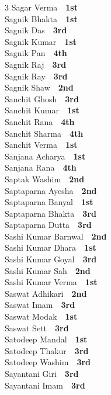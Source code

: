 \documentclass[11pt,a4paper]{article}
\begin{document}
\begin{multicols}{3}
Sagar Verma~\dotfill~\textbf{1st}\\
Sagnik Bhakta~\dotfill~\textbf{1st}\\
Sagnik Das~\dotfill~\textbf{3rd}\\
Sagnik Kumar~\dotfill~\textbf{1st}\\
Sagnik Pan~\dotfill~\textbf{4th}\\
Sagnik Raj~\dotfill~\textbf{3rd}\\
Sagnik Ray~\dotfill~\textbf{3rd}\\
Sagnik Shaw~\dotfill~\textbf{2nd}\\
Sanchit Ghosh~\dotfill~\textbf{3rd}\\
Sanchit Kumar~\dotfill~\textbf{1st}\\
Sanchit Rana~\dotfill~\textbf{4th}\\
Sanchit Sharma~\dotfill~\textbf{4th}\\
Sanchit Verma~\dotfill~\textbf{1st}\\
Sanjana Acharya~\dotfill~\textbf{1st}\\
Sanjana Rana~\dotfill~\textbf{4th}\\
Saptak Washim~\dotfill~\textbf{2nd}\\
Saptaparna Ayesha~\dotfill~\textbf{2nd}\\
Saptaparna Banyal~\dotfill~\textbf{1st}\\
Saptaparna Bhakta~\dotfill~\textbf{3rd}\\
Saptaparna Dutta~\dotfill~\textbf{3rd}\\
Sashi Kumar Barnwal~\dotfill~\textbf{2nd}\\
Sashi Kumar Dhara~\dotfill~\textbf{1st}\\
Sashi Kumar Goyal~\dotfill~\textbf{3rd}\\
Sashi Kumar Sah~\dotfill~\textbf{2nd}\\
Sashi Kumar Verma~\dotfill~\textbf{1st}\\
Saswat Adhikari~\dotfill~\textbf{2nd}\\
Saswat Imam~\dotfill~\textbf{3rd}\\
Saswat Modak~\dotfill~\textbf{1st}\\
Saswat Sett~\dotfill~\textbf{3rd}\\
Satodeep Mandal~\dotfill~\textbf{1st}\\
Satodeep Thakur~\dotfill~\textbf{3rd}\\
Satodeep Washim~\dotfill~\textbf{3rd}\\
Sayantani Giri~\dotfill~\textbf{3rd}\\
Sayantani Imam~\dotfill~\textbf{3rd}\\

\end{multicols}
\end{document}
